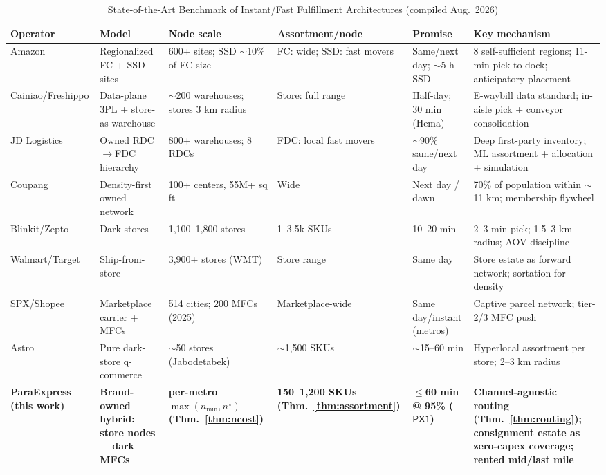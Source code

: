 \documentclass[journal]{IEEEtran}
\begin{document}
\begin{table}[!t]
\caption{State-of-the-Art Benchmark of Instant/Fast Fulfillment Architectures (compiled Aug.\ 2026)}
\label{tab:benchmark}
\centering
\scriptsize
\begin{tabularx}{\textwidth}{@{}p{20mm} p{28mm} p{28mm} p{22mm} p{22mm} X@{}}
\toprule
\textbf{Operator} & \textbf{Model} & \textbf{Node scale} & \textbf{Assortment/node} & \textbf{Promise} & \textbf{Key mechanism} \\
\midrule
Amazon \cite{amazonregional,costar} & Regionalized FC + SSD sites & 600+ sites; SSD ${\sim}$10\% of FC size & FC: wide; SSD: fast movers & Same/next day; ${\sim}$5 h SSD & 8 self-sufficient regions; 11-min pick-to-dock; anticipatory placement \\
Cainiao/Freshippo \cite{cainiao,hema} & Data-plane 3PL + store-as-warehouse & ${\sim}$200 warehouses; stores 3 km radius & Store: full range & Half-day; 30 min (Hema) & E-waybill data standard; in-aisle pick + conveyor consolidation \\
JD Logistics \cite{jdwarehouses,jdassort} & Owned RDC$\to$FDC hierarchy & 800+ warehouses; 8 RDCs & FDC: local fast movers & ${\sim}$90\% same/next day & Deep first-party inventory; ML assortment + allocation + simulation \\
Coupang \cite{coupang} & Density-first owned network & 100+ centers, 55M+ sq ft & Wide & Next day / dawn & 70\% of population within ${\sim}$11 km; membership flywheel \\
Blinkit/Zepto \cite{indiaqc,blinkit} & Dark stores & 1{,}100--1{,}800 stores & 1--3.5k SKUs & 10--20 min & 2--3 min pick; 1.5--3 km radius; AOV discipline \\
Walmart/Target \cite{walmart,target} & Ship-from-store & 3{,}900+ stores (WMT) & Store range & Same day & Store estate as forward network; sortation for density \\
SPX/Shopee \cite{spx,shopeemfc} & Marketplace carrier + MFCs & 514 cities; 200 MFCs (2025) & Marketplace-wide & Same day/instant (metros) & Captive parcel network; tier-2/3 MFC push \\
Astro \cite{astroken,astrogpca} & Pure dark-store q-commerce & ${\sim}$50 stores (Jabodetabek) & ${\sim}$1{,}500 SKUs & ${\sim}$15--60 min & Hyperlocal assortment per store; 2--3 km radius \\
\midrule
\textbf{ParaExpress (this work)} & \textbf{Brand-owned hybrid: store nodes + dark MFCs} & \textbf{per-metro $\max(n_{\min}, n^\star)$ (Thm.~\ref{thm:ncost})} & \textbf{150--1{,}200 SKUs (Thm.~\ref{thm:assortment})} & \textbf{$\le$60 min @ 95\% ($\mathsf{PX1}$)} & \textbf{Channel-agnostic routing (Thm.~\ref{thm:routing}); consignment estate as zero-capex coverage; rented mid/last mile} \\
\bottomrule
\end{tabularx}
\end{table}
\end{document}
